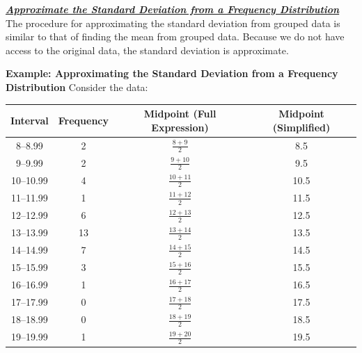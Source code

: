 \documentclass{report}
\begin{document}
         \pagebreak \bigbreak \noindent
         \textbf{\textit{\underline{Approximate the Standard Deviation from a Frequency Distribution}}}
         \bigbreak \noindent 
         The procedure for approximating the standard deviation from grouped data is similar to that of finding the mean from grouped data. Because we do not have access to the original data, the standard deviation is approximate.
         \bigbreak \noindent 
         \begin{mdframed}
           \textbf{Example: Approximating the Standard Deviation from a Frequency Distribution}
           \bigbreak \noindent 
           Consider the data:
                                 \begin{center}
               \begin{tabular}{|c|c|c|c|}
                    \hline
                    Interval & Frequency & Midpoint (Full Expression) & Midpoint (Simplified) \\
                    \hline
                    8--8.99 & 2 & $\frac{8 + 9}{2}$ & 8.5 \\
                    \hline
                    9--9.99 & 2 & $\frac{9 + 10}{2}$ & 9.5 \\
                    \hline
                    10--10.99 & 4 & $\frac{10 + 11}{2}$ & 10.5 \\
                    \hline
                    11--11.99 & 1 & $\frac{11 + 12}{2}$ & 11.5 \\
                    \hline
                    12--12.99 & 6 & $\frac{12 + 13}{2}$ & 12.5 \\
                    \hline
                    13--13.99 & 13 & $\frac{13 + 14}{2}$ & 13.5 \\
                    \hline
                    14--14.99 & 7 & $\frac{14 + 15}{2}$ & 14.5 \\
                    \hline
                    15--15.99 & 3 & $\frac{15 + 16}{2}$ & 15.5 \\
                    \hline
                    16--16.99 & 1 & $\frac{16 + 17}{2}$ & 16.5 \\
                    \hline
                    17--17.99 & 0 & $\frac{17 + 18}{2}$ & 17.5 \\
                    \hline
                    18--18.99 & 0 & $\frac{18 + 19}{2}$ & 18.5 \\
                    \hline
                    19--19.99 & 1 & $\frac{19 + 20}{2}$ & 19.5 \\
                    \hline

\end{tabular}
\end{center}
\end{mdframed}
\end{document}
